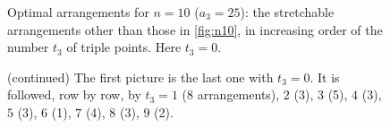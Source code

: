 \newcommand\nten[1]{\begin{minipage}{0.192\linewidth}\end{minipage}}

\begin{figure}[p]
\noindent\nten{10}\ngap\nten{14}\ngap\nten{15}\ngap\nten{16}\ngap\nten{24}\par\vspace{1mm}
\noindent\nten{25}\ngap\nten{26}\ngap\nten{33}\ngap\nten{37}\ngap\nten{38}\par\vspace{1mm}
\noindent\nten{40}\ngap\nten{41}\ngap\nten{42}\ngap\nten{44}\ngap\nten{45}\par\vspace{1mm}
\noindent\nten{47}\ngap\nten{48}\ngap\nten{49}\ngap\nten{50}\ngap\nten{51}\par\vspace{1mm}
\noindent\nten{52}\ngap\nten{54}\ngap\nten{56}\ngap\nten{57}\ngap\nten{58}\par\vspace{1mm}
\noindent\nten{59}\ngap\nten{60}\ngap\nten{61}\ngap\nten{62}\ngap\nten{63}\par\vspace{1mm}
\noindent\nten{64}\ngap\nten{66}\ngap\nten{67}\ngap\nten{68}\ngap\nten{69}
\caption{Optimal arrangements for $n=10$ ($a_3=25$): the stretchable arrangements other than those in \cref{fig:n10}, in increasing order of the number $t_3$ of triple points. Here $t_3=0$.}
\label{fig:n10-all}
\end{figure}

\begin{figure}[p]
\ContinuedFloat
\noindent\nten{70}\ngap\nten{07}\ngap\nten{17}\ngap\nten{18}\ngap\nten{21}\par\vspace{1mm}
\noindent\nten{23}\ngap\nten{30}\ngap\nten{39}\ngap\nten{55}\ngap\nten{04}\par\vspace{1mm}
\noindent\nten{13}\ngap\nten{22}\ngap\nten{03}\ngap\nten{05}\ngap\nten{12}\par\vspace{1mm}
\noindent\nten{28}\ngap\nten{29}\ngap\nten{02}\ngap\nten{11}\ngap\nten{35}\par\vspace{1mm}
\noindent\nten{01}\ngap\nten{06}\ngap\nten{19}\ngap\nten{53}\ngap\nten{09}\par\vspace{1mm}
\noindent\nten{20}\ngap\nten{34}\ngap\nten{43}\ngap\nten{08}\ngap\nten{36}\par\vspace{1mm}
\noindent\nten{46}\ngap\nten{31}\ngap\nten{32}
\caption[]{(continued) The first picture is the last one with $t_3=0$. It is followed, row by row, by $t_3=1$ (8 arrangements), $2$ (3), $3$ (5), $4$ (3), $5$ (3), $6$ (1), $7$ (4), $8$ (3), $9$ (2).}
\end{figure}


